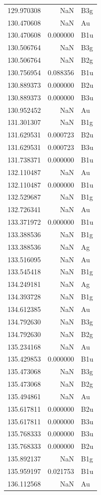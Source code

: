 \begin{longtable}{rrl}
129.970308 & NaN & B3g \\
130.470608 & NaN & Au \\
130.470608 & 0.000000 & B1u \\
130.506764 & NaN & B3g \\
130.506764 & NaN & B2g \\
130.756954 & 0.088356 & B1u \\
130.889373 & 0.000000 & B2u \\
130.889373 & 0.000000 & B3u \\
130.952452 & NaN & Au \\
131.301307 & NaN & B1g \\
131.629531 & 0.000723 & B2u \\
131.629531 & 0.000723 & B3u \\
131.738371 & 0.000000 & B1u \\
132.110487 & NaN & Au \\
132.110487 & 0.000000 & B1u \\
132.529687 & NaN & B1g \\
132.726341 & NaN & Au \\
133.371972 & 0.000000 & B1u \\
133.388536 & NaN & B1g \\
133.388536 & NaN & Ag \\
133.516095 & NaN & Au \\
133.545418 & NaN & B1g \\
134.249181 & NaN & Ag \\
134.393728 & NaN & B1g \\
134.612385 & NaN & Au \\
134.792630 & NaN & B3g \\
134.792630 & NaN & B2g \\
135.234168 & NaN & Au \\
135.429853 & 0.000000 & B1u \\
135.473068 & NaN & B3g \\
135.473068 & NaN & B2g \\
135.494861 & NaN & Au \\
135.617811 & 0.000000 & B2u \\
135.617811 & 0.000000 & B3u \\
135.768333 & 0.000000 & B3u \\
135.768333 & 0.000000 & B2u \\
135.892137 & NaN & B1g \\
135.959197 & 0.021753 & B1u \\
136.112568 & NaN & Au \\

\end{longtable}
